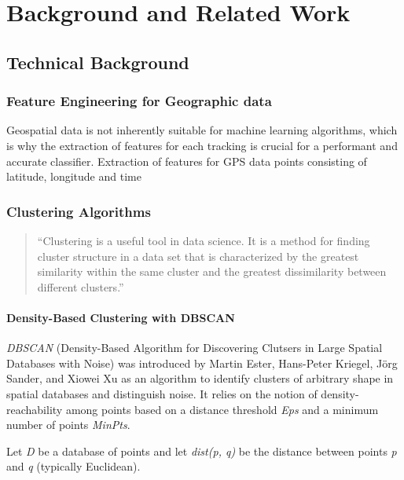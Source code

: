 \documentclass[a4paper,12pt,twoside]{scrreprt}
\begin{document}
\chapter{Background and Related Work}

\section{Technical Background}

\subsection{Feature Engineering for Geographic data}
Geospatial data is not inherently suitable for machine learning algorithms,
which is why the extraction
of features for each tracking is crucial for a performant and accurate
classifier.
Extraction of features for GPS data points consisting of latitude, longitude
and time

\subsection{Clustering Algorithms}
\begin{quote}
  ``Clustering is a useful tool in data science. It is a method for
  finding cluster structure in a data set that is characterized by
  the greatest similarity within the same cluster and the
  greatest dissimilarity between different
  clusters.''\cite{sinaga_pdf_2024}
\end{quote}

\subsubsection{Density-Based Clustering with DBSCAN}

\textit{DBSCAN} (Density-Based Algorithm for Discovering Clutsers in Large
Spatial Databases with Noise) was
introduced by Martin Ester, Hans-Peter Kriegel, Jörg Sander, and Xiowei Xu as
an algorithm to
identify
clusters of arbitrary shape in spatial databases and distinguish noise. It
relies on the notion of density-reachability among points based on a distance
threshold \textit{Eps} and a minimum number of points
\textit{MinPts}.\cite{ester_density-based_nodate}

Let \textit{D} be a database of points and let \textit{dist(p, q)} be the
distance between points \textit{p} and \textit{q} (typically Euclidean).
\end{document}
